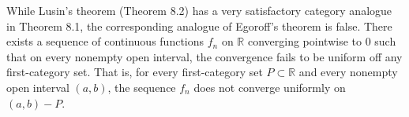 While Lusin's theorem (Theorem 8.2) has a very satisfactory category analogue in Theorem 8.1, the corresponding analogue of Egoroff's theorem is false. There exists a sequence of continuous functions $f_n$ on $\mathbb{R}$ converging pointwise to $0$ such that on every nonempty open interval, the convergence fails to be uniform off any first-category set. That is, for every first-category set $P \subset \mathbb{R}$ and every nonempty open interval $(a,b)$, the sequence $f_n$ does not converge uniformly on $(a,b) - P$.
